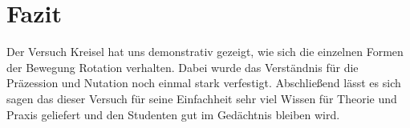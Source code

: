

\chapter{Fazit}
\label{chap:fazit}

Der Versuch Kreisel hat uns demonstrativ gezeigt, wie sich die einzelnen Formen der Bewegung Rotation verhalten. Dabei wurde das Verständnis für die Präzession und Nutation noch einmal stark verfestigt. Abschließend lässt es sich sagen das dieser Versuch für seine Einfachheit sehr viel Wissen für Theorie und Praxis geliefert und den Studenten gut im Gedächtnis bleiben wird.
